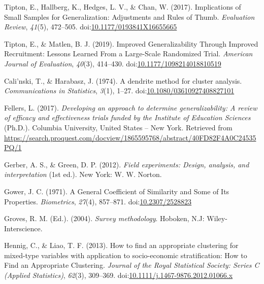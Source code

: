 \documentclass[man,floatsintext]{apa6}
\begin{document}
\leavevmode\hypertarget{ref-tiptonImplicationsSmallSamples2017}{}%
Tipton, E., Hallberg, K., Hedges, L. V., \& Chan, W. (2017). Implications of Small Samples for Generalization: Adjustments and Rules of Thumb. \emph{Evaluation Review}, \emph{41}(5), 472--505. doi:\href{https://doi.org/10.1177/0193841X16655665}{10.1177/0193841X16655665}

\leavevmode\hypertarget{ref-tiptonImprovedGeneralizabilityImproved2019}{}%
Tipton, E., \& Matlen, B. J. (2019). Improved Generalizability Through Improved Recruitment: Lessons Learned From a Large-Scale Randomized Trial. \emph{American Journal of Evaluation}, \emph{40}(3), 414--430. doi:\href{https://doi.org/10.1177/1098214018810519}{10.1177/1098214018810519}

\leavevmode\hypertarget{ref-calinskiDendriteMethodCluster1974}{}%
Cali\a'nski, T., \& Harabasz, J. (1974). A dendrite method for cluster analysis. \emph{Communications in Statistics}, \emph{3}(1), 1--27. doi:\href{https://doi.org/10.1080/03610927408827101}{10.1080/03610927408827101}

\leavevmode\hypertarget{ref-fellersDevelopingApproachDetermine2017}{}%
Fellers, L. (2017). \emph{Developing an approach to determine generalizability: A review of efficacy and effectiveness trials funded by the Institute of Education Sciences} (Ph.D.). Columbia University, United States -- New York. Retrieved from \url{https://search.proquest.com/docview/1865595768/abstract/40FD82F4A0C24535PQ/1}

\leavevmode\hypertarget{ref-gerberFieldExperimentsDesign2012}{}%
Gerber, A. S., \& Green, D. P. (2012). \emph{Field experiments: Design, analysis, and interpretation} (1st ed.). New York: W. W. Norton.

\leavevmode\hypertarget{ref-gowerGeneralCoefficientSimilarity1971}{}%
Gower, J. C. (1971). A General Coefficient of Similarity and Some of Its Properties. \emph{Biometrics}, \emph{27}(4), 857--871. doi:\href{https://doi.org/10.2307/2528823}{10.2307/2528823}

\leavevmode\hypertarget{ref-grovesSurveyMethodology2004}{}%
Groves, R. M. (Ed.). (2004). \emph{Survey methodology}. Hoboken, N.J: Wiley-Interscience.

\leavevmode\hypertarget{ref-hennigHowFindAppropriate2013}{}%
Hennig, C., \& Liao, T. F. (2013). How to find an appropriate clustering for mixed-type variables with application to socio-economic stratification: How to Find an Appropriate Clustering. \emph{Journal of the Royal Statistical Society: Series C (Applied Statistics)}, \emph{62}(3), 309--369. doi:\href{https://doi.org/10.1111/j.1467-9876.2012.01066.x}{10.1111/j.1467-9876.2012.01066.x}
\end{document}
